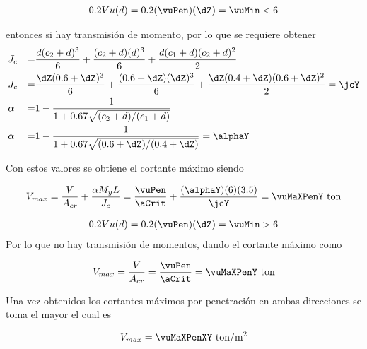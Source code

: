 \documentclass[11pt,a4paper,fleqn]{article}
\begin{document}
\FPifgt \myZ \vuMin  
	{
	\begin{align*}
		0.2Vu(d)=0.2(\vuPen)(\dZ)=\vuMin<\myZ 
	\end{align*}

entonces si hay transmisión de momento, por lo que se requiere obtener 
	\begin{align*}
		&J_c&=&\frac{d(c_2+d)^3}{6}+\frac{(c_2+d)(d)^3}{6}+\frac{d(c_1+d)(c_2+d)^2}{2}\\
		&J_c&=&\frac{\dZ(\cbZ+\dZ)^3}{6}+\frac{(\cbZ+\dZ)(\dZ)^3}{6}+\frac{\dZ(\caZ+\dZ)(\cbZ+\dZ)^2}{2}=\jcY\\
		&\alpha&=&1-\frac{1}{1+0.67\sqrt{(c_2+d)/(c_1+d)}}\\
		&\alpha&=&1-\frac{1}{1+0.67\sqrt{(\cbZ+\dZ)/(\caZ+\dZ)}}=\alphaY
	\end{align*}
	
	Con estos valores se obtiene el cortante máximo siendo
	
	\begin{align*}
		V_{max}=\frac{V}{A_{cr}}+\frac{\alpha M_y L}{J_c}=\frac{\vuPen}{\aCrit}+\frac{(\alphaY)(\myZ)(\lZ)}{\jcY}=\vuMaXPenY \text{ ton}
	\end{align*}
	} 
\else
	{
	\begin{align*}
		0.2Vu(d)=0.2(\vuPen)(\dZ)=\vuMin>\myZ 
	\end{align*}
	Por lo que no hay transmisión de momentos, dando el cortante máximo como
	
	
	\begin{align*}
		V_{max}=\frac{V}{A_{cr}}=\frac{\vuPen}{\aCrit}=\vuMaXPenY \text{ ton}
	\end{align*}
  }
\fi

\vuMaXPenY

\vuMaXPen

Una vez obtenidos los cortantes máximos por penetración en ambas direcciones se toma el mayor el cual es

\begin{align*}
		V_{max}=\vuMaXPenXY \text{ ton/m$^2$}
	\end{align*}
\end{document}
